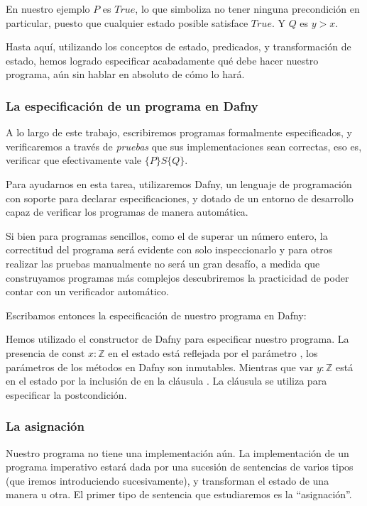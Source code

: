 \documentclass[12pt, a4paper, openany, fleqn]{book}
\newcommand{\declConst}[2]{\text{const } #1 : #2}
\newcommand{\declVar}[2]{\text{var } #1 : #2}
\begin{document}
    En nuestro ejemplo $P$ es $True$, lo que simboliza no tener ninguna precondición en particular, puesto que cualquier estado posible satisface $True$. Y $Q$ es $y > x$.

    Hasta aquí, utilizando los conceptos de estado, predicados, y transformación de estado, hemos logrado especificar acabadamente qué debe hacer nuestro programa, aún sin hablar en absoluto de cómo lo hará.

    \subsubsection*{La especificación de un programa en Dafny}

    A lo largo de este trabajo, escribiremos programas formalmente especificados, y verificaremos a través de \textit{pruebas} que sus implementaciones sean correctas, eso es, verificar que efectivamente vale $\{P\}S\{Q\}$.

    Para ayudarnos en esta tarea, utilizaremos Dafny, un lenguaje de programación con soporte para declarar especificaciones, y dotado de un entorno de desarrollo capaz de verificar los programas de manera automática.

    Si bien para programas sencillos, como el de superar un número entero, la correctitud del programa será evidente con solo inspeccionarlo y para otros realizar las pruebas manualmente no será un gran desafío, a medida que construyamos programas más complejos descubriremos la practicidad de poder contar con un verificador automático.

    Escribamos entonces la especificación de nuestro programa en Dafny:


    Hemos utilizado el constructor  de Dafny para especificar nuestro programa. La presencia de $\declConst{x}{\mathbb{Z}}$ en el estado está reflejada por el parámetro , los parámetros de los métodos en Dafny son inmutables. Mientras que $\declVar{y}{\mathbb{Z}}$ está en el estado por la inclusión de  en la cláusula .
    La cláusula  se utiliza para especificar la postcondición.

    \subsubsection*{La asignación}
    Nuestro programa no tiene una implementación aún. La implementación de un programa imperativo estará dada por una sucesión de sentencias de varios tipos (que iremos introduciendo sucesivamente), y transforman el estado de una manera u otra. El primer tipo de sentencia que estudiaremos es la ``asignación''.
\end{document}
